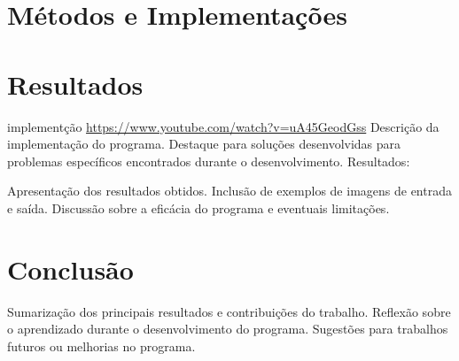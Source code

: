 \documentclass[english, 
               brazil, 
               bsc] %
               {dcomp-abntex2}
\begin{document}


\chapter{Métodos e Implementações}



\chapter{Resultados}

implementção \url{https://www.youtube.com/watch?v=uA45GeodGss}
Descrição da implementação do programa.
Destaque para soluções desenvolvidas para problemas específicos encontrados durante o desenvolvimento.
Resultados:

Apresentação dos resultados obtidos.
Inclusão de exemplos de imagens de entrada e saída.
Discussão sobre a eficácia do programa e eventuais limitações.

\chapter{Conclusão}

Sumarização dos principais resultados e contribuições do trabalho.
Reflexão sobre o aprendizado durante o desenvolvimento do programa.
Sugestões para trabalhos futuros ou melhorias no programa.









\postextual


\renewcommand{\chapnumfont}{\chaptitlefont}
\renewcommand{\afterchapternum}{}
% 
% 
\end{document}

